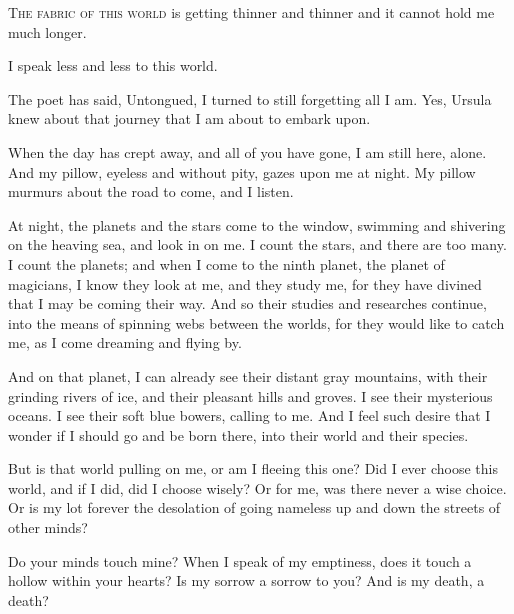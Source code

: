 
\lettrine{T}{he fabric of this world}
is getting thinner and thinner and it cannot
hold me much longer.

I speak less and less to this world.

The poet has said, Untongued, I turned to still forgetting all I am.
Yes, Ursula knew about that journey that I am about to embark upon.

When the day has crept away, and all of you have gone, I am still here,
alone. And my pillow, eyeless and without pity, gazes upon me at night.
My pillow murmurs about the road to come, and I listen.

At night, the planets and the stars come to the window, swimming and
shivering on the heaving sea, and look in on me. I count the stars, and
there are too many. I count the planets; and when I come to the ninth
planet, the planet of magicians, I know they look at me, and they study
me, for they have divined that I may be coming their way. And so their
studies and researches continue, into the means of spinning webs between
the worlds, for they would like to catch me, as I come dreaming and
flying by.

And on that planet, I can already see their distant gray mountains, with
their grinding rivers of ice, and their pleasant hills and groves. I see
their mysterious oceans. I see their soft blue bowers, calling to me.
And I feel such desire that I wonder if I should go and be born there,
into their world and their species.

But is that world pulling on me, or am I fleeing this one? Did I ever
choose this world, and if I did, did I choose wisely? Or for me, was
there never a wise choice. Or is my lot forever the desolation of going
nameless up and down the streets of other minds?

Do your minds touch mine? When I speak of my emptiness, does it touch a
hollow within your hearts? Is my sorrow a sorrow to you? And is my
death, a death?
